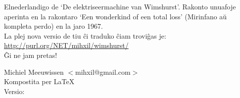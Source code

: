 \noindent
\begin{minipage}[t]{\textwidth}
Elnederlandigo de `De elektriseermachine van Wimshurst'.  Rakonto unuafoje aperinta en la rakontaro `Een wonderkind of een total loss'
(Mirinfano a\u{u} kompleta perdo) en la jaro 1967.\\

La plej nova versio de tiu \^ci traduko \^ciam trovi\^gas je:\\
\href{http://purl.org/NET/mihxil/wimshurst/}{http://purl.org/NET/mihxil/wimshurst/}\\

\^Gi ne jam pretas!

Michiel  Meeuwissen $<$mihxil@gmail.com$>$\\

Kompostita per \LaTeX\\
Versio: 
\end{minipage}
\newpage
\pagestyle{plain}
\setcounter{page}{1}
